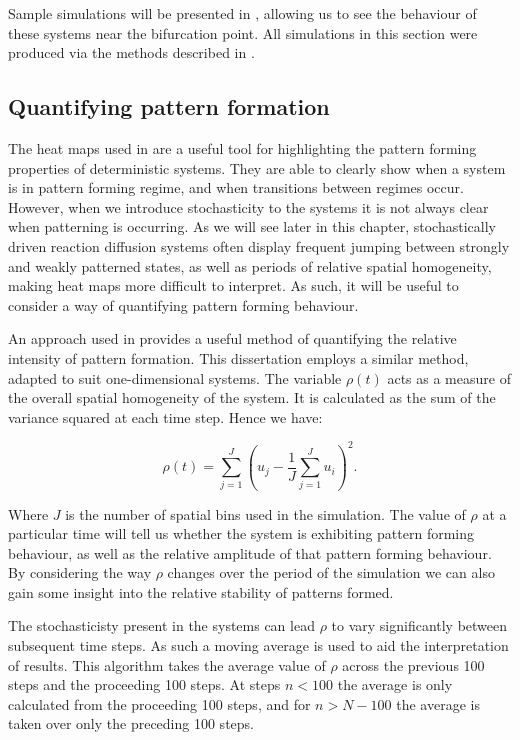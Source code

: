 \documentclass[12pt]{article}
\begin{document}
Sample simulations will be presented in , allowing us to see the behaviour of these systems near the bifurcation point. All simulations in this section were produced via the methods described in .

\subsection{Quantifying pattern formation}

The heat maps used in  are a useful tool for highlighting the pattern forming properties of deterministic systems. They are able to clearly show when a system is in pattern forming regime, and when transitions between regimes occur. However, when we introduce stochasticity to the systems it is not always clear when patterning is occurring. As we will see later in this chapter, stochastically driven reaction diffusion systems often display frequent jumping between strongly and weakly patterned states, as well as periods of relative spatial homogeneity, making heat maps more difficult to interpret. As such, it will be useful to consider a way of quantifying pattern forming behaviour. 

An approach used in \cite{Zheng-Ping} provides a useful method of quantifying the relative intensity of pattern formation. This dissertation employs a similar method, adapted to suit one-dimensional systems. The variable $\rho (t)$ acts as a measure of the overall spatial homogeneity of the system. It is calculated as the sum of the variance squared at each time step. Hence we have:

\begin{equation} \label{rho}
    \rho (t) = \sum_{j=1}^J \left(u_j - \frac{1}{J}\sum_{j=1}^J u_i\right)^2.
\end{equation}

Where $J$ is the number of spatial bins used in the simulation. The value of $\rho$ at a particular time will tell us whether the system is exhibiting pattern forming behaviour, as well as the relative amplitude of that pattern forming behaviour. By considering the way $\rho$ changes over the period of the simulation we can also gain some insight into the relative stability of patterns formed.

The stochasticisty present in the systems can lead $\rho$ to vary significantly between subsequent time steps. As such a moving average is used to aid the interpretation of results. This algorithm takes the average value of $\rho$ across the previous 100 steps and the proceeding 100 steps. At steps $n<100$ the average is only calculated from the proceeding 100 steps, and for $n>N-100$ the average is taken over only the preceding 100 steps. 
\end{document}
